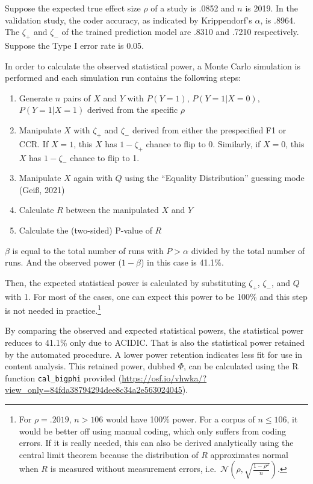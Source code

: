 \documentclass[english,man,floatsintext]{apa6}
\providecommand{\tightlist}{%
  \setlength{\itemsep}{0pt}\setlength{\parskip}{0pt}}
\begin{document}
Suppose the expected true effect size \(\rho\) of a study is .0852 and \(n\) is 2019. In the validation study, the coder accuracy, as indicated by Krippendorf's \(\alpha\), is .8964. The \(\zeta_{+}\) and \(\zeta_{-}\) of the trained prediction model are .8310 and .7210 respectively. Suppose the Type I error rate is 0.05.

In order to calculate the observed statistical power, a Monte Carlo simulation is performed and each simulation run contains the following steps:

\begin{enumerate}
\def\labelenumi{\arabic{enumi}.}
\tightlist
\item
  Generate \(n\) pairs of \(X\) and \(Y\) with \(P(Y=1)\), \(P(Y=1|X=0)\), \(P(Y=1|X=1)\) derived from the specific \(\rho\)
\item
  Manipulate \(X\) with \(\zeta_{+}\) and \(\zeta_{-}\) derived from either the prespecified F1 or CCR. If \(X = 1\), this \(X\) has \(1 - \zeta_{+}\) chance to flip to 0. Similarly, if \(X = 0\), this \(X\) has \(1 - \zeta_{-}\) chance to flip to 1.
\item
  Manipulate \(X\) again with \(Q\) using the \enquote{Equality Distribution} guessing mode (Geiß, 2021)
\item
  Calculate \(R\) between the manipulated \(X\) and \(Y\)
\item
  Calculate the (two-sided) P-value of \(R\)
\end{enumerate}

\(\beta\) is equal to the total number of runs with \(P > \alpha\) divided by the total number of runs. And the observed power (\(1 - \beta\)) in this case is 41.1\%.

Then, the expected statistical power is calculated by substituting \(\zeta_{+}\), \(\zeta_{-}\), and \(Q\) with 1. For most of the cases, one can expect this power to be 100\% and this step is not needed in practice.\footnote{For \(\rho = .2019\), \(n > 106\) would have 100\% power. For a corpus of \(n \le 106\), it would be better off using manual coding, which only suffers from coding errors. If it is really needed, this can also be derived analytically using the central limit theorem because the distribution of \(R\) approximates normal when \(R\) is measured without measurement errors, i.e.~\(\mathcal{N}(\rho, \sqrt{\frac{1 - \rho^{2}}{n}})\).}

By comparing the observed and expected statistical powers, the statistical power reduces to 41.1\% only due to ACIDIC. That is also the statistical power retained by the automated procedure. A lower power retention indicates less fit for use in content analysis. This retained power, dubbed \(\Phi\), can be calculated using the R function \texttt{cal\_bigphi} provided (\url{https://osf.io/vhwka/?view_only=84fda38794294dee8c34a2e563024045}).
\end{document}
